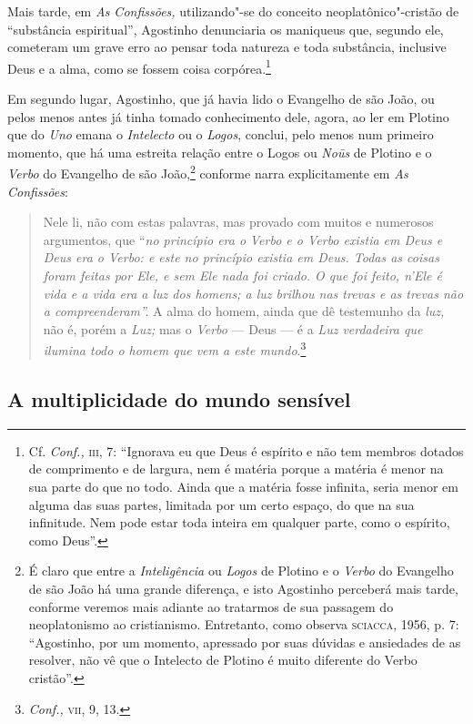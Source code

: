 Mais tarde, em \emph{As Confissões,} utilizando"-se do conceito
neoplatônico"-cristão de “substância espiritual”, Agostinho
denunciaria os maniqueus que, segundo ele, cometeram um grave
erro ao pensar toda natureza e toda substância, inclusive Deus e
a alma, como se fossem coisa corpórea.\footnote{ Cf.
\emph{Conf.,} \textsc{iii}, 7:  “Ignorava eu que Deus é espírito e não
tem membros dotados de comprimento e de largura, nem é matéria
porque a matéria é menor na sua parte do que no todo. Ainda que
a matéria fosse infinita, seria menor em alguma das suas partes,
limitada por um certo espaço, do que na sua infinitude. Nem pode
estar toda inteira em qualquer parte, como o espírito, como
Deus”.} 

Em segundo lugar,  Agostinho, que já havia lido o Evangelho de
são João, ou pelos menos antes já tinha tomado conhecimento
dele, agora,  ao ler em Plotino que do \emph{Uno} emana o
\emph{Intelecto} ou o \emph{Logos}, conclui, pelo menos num
primeiro momento,  que há uma estreita relação entre o Logos ou
\emph{Noūs} de Plotino e o \emph{Verbo} do Evangelho de são
João,\footnote{ É claro que entre a \emph{Inteligência}
ou\emph{ Logos} de Plotino e o \emph{Verbo} do Evangelho de
são João há uma grande diferença, e isto Agostinho perceberá
mais tarde, conforme veremos mais adiante ao tratarmos de sua
passagem do neoplatonismo ao cristianismo. Entretanto, como
observa \textsc{sciacca}, 1956, p. 7: “Agostinho, por um momento,
apressado por suas dúvidas e ansiedades de as resolver, não vê
que o Intelecto de Plotino é muito diferente do Verbo
cristão”.} conforme narra explicitamente em \emph{As
Confissões}: 

\begin{quote}
Nele li, não com estas palavras, mas provado com muitos e
numerosos argumentos, que ``\emph{no princípio era o}
\emph{Verbo e o Verbo existia em Deus e Deus era o Verbo: e
este no princípio existia em Deus. Todas as coisas foram feitas
por Ele, e sem Ele nada foi criado. O que foi feito,  n'Ele é
vida e a vida era a luz dos homens; a luz brilhou nas trevas e
as trevas não a compreenderam''.} A alma do homem, ainda que dê
testemunho da \emph{luz,} não é, porém a \emph{Luz;} mas
o\emph{ Verbo} --- Deus --- é a \emph{Luz verdadeira que ilumina
todo o homem que vem a este mundo}.\footnote{ \emph{Conf.,}
\textsc{vii}, 9, 13.} 
\end{quote}

\subsection{A multiplicidade do mundo sensível}

